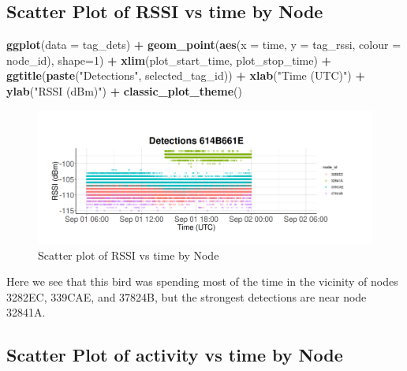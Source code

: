\documentclass[
]{book}
\newenvironment{Shaded}{\begin{snugshade}}{\end{snugshade}}
\newcommand{\AttributeTok}[1]{\textcolor[rgb]{0.13,0.29,0.53}{#1}}
\newcommand{\DecValTok}[1]{\textcolor[rgb]{0.00,0.00,0.81}{#1}}
\newcommand{\FunctionTok}[1]{\textcolor[rgb]{0.13,0.29,0.53}{\textbf{#1}}}
\newcommand{\NormalTok}[1]{#1}
\newcommand{\SpecialCharTok}[1]{\textcolor[rgb]{0.81,0.36,0.00}{\textbf{#1}}}
\newcommand{\StringTok}[1]{\textcolor[rgb]{0.31,0.60,0.02}{#1}}
\begin{document}
\subsection{Scatter Plot of RSSI vs time by Node}\label{scatter-plot-of-rssi-vs-time-by-node}

\begin{Shaded}
\begin{Highlighting}[]
\FunctionTok{ggplot}\NormalTok{(}\AttributeTok{data =}\NormalTok{ tag\_dets) }\SpecialCharTok{+}
  \FunctionTok{geom\_point}\NormalTok{(}\FunctionTok{aes}\NormalTok{(}\AttributeTok{x =}\NormalTok{ time, }
                 \AttributeTok{y =}\NormalTok{ tag\_rssi, }
                 \AttributeTok{colour =}\NormalTok{ node\_id), }
             \AttributeTok{shape=}\DecValTok{1}\NormalTok{) }\SpecialCharTok{+}
  \FunctionTok{xlim}\NormalTok{(plot\_start\_time, plot\_stop\_time) }\SpecialCharTok{+}
  \FunctionTok{ggtitle}\NormalTok{(}\FunctionTok{paste}\NormalTok{(}\StringTok{"Detections"}\NormalTok{, selected\_tag\_id)) }\SpecialCharTok{+}
  \FunctionTok{xlab}\NormalTok{(}\StringTok{"Time (UTC)"}\NormalTok{) }\SpecialCharTok{+} 
  \FunctionTok{ylab}\NormalTok{(}\StringTok{"RSSI (dBm)"}\NormalTok{) }\SpecialCharTok{+}
  \FunctionTok{classic\_plot\_theme}\NormalTok{()}
\end{Highlighting}
\end{Shaded}

\begin{figure}
\centering
\includegraphics{images/activity_level_rssi_vs_time_by_node.png}
\caption{Scatter plot of RSSI vs time by Node}
\end{figure}

Here we see that this bird was spending most of the time in the vicinity of nodes 3282EC, 339CAE, and 37824B, but the strongest detections are near node 32841A.

\subsection{Scatter Plot of activity vs time by Node}\label{scatter-plot-of-activity-vs-time-by-node}
\end{document}
